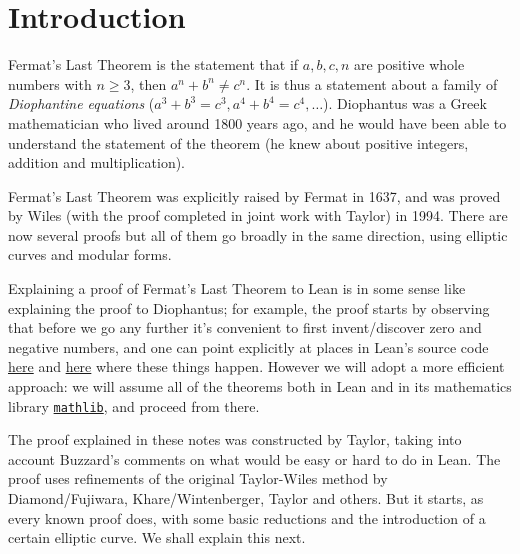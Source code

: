 \chapter{Introduction}

Fermat's Last Theorem is the statement that if $a,b,c,n$ are positive whole numbers with $n\geq 3$, then $a^n+b^n\not=c^n$. It is thus a statement about a family of \emph{Diophantine equations} ($a^3+b^3=c^3, a^4+b^4=c^4,\ldots$). Diophantus was a Greek mathematician who lived around 1800 years ago, and he would have been able to understand the statement of the theorem (he knew about positive integers, addition and multiplication).

Fermat's Last Theorem was explicitly raised by Fermat in 1637, and was proved by Wiles (with the proof completed in joint work with Taylor) in 1994. There are now several proofs but all of them go broadly in the same direction, using elliptic curves and modular forms.

Explaining a proof of Fermat's Last Theorem to Lean is in some sense like explaining the proof to Diophantus; for example, the proof starts by observing that before we go any further it's convenient to first invent/discover zero and negative numbers, and one can point explicitly at places in Lean's source code \href{https://github.com/leanprover/lean4/blob/260eaebf4e804c9ac1319532970544a4e157c336/src/Init/Prelude.lean#L1049}{here} and \href{https://github.com/leanprover/lean4/blob/260eaebf4e804c9ac1319532970544a4e157c336/src/Init/Data/Int/Basic.lean#L45}{here} where these things happen. However we will adopt a more efficient approach: we will assume all of the theorems both in Lean and in its mathematics library \href{https://github.com/leanprover-community/mathlib4}{\tt mathlib}, and proceed from there.

The proof explained in these notes was constructed by Taylor, taking into account Buzzard's comments on what would be easy or hard to do in Lean. The proof uses refinements of the original Taylor-Wiles method by Diamond/Fujiwara, Khare/Wintenberger, Taylor and others. But it starts, as every known proof does, with some basic reductions and the introduction of a certain elliptic curve. We shall explain this next.
